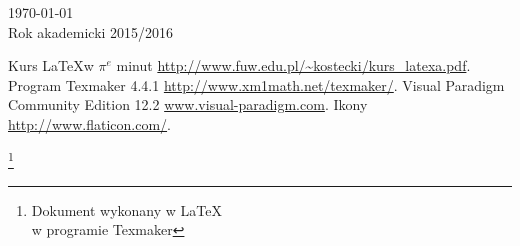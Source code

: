 \documentclass[12pt,a4paper]{article}
\newcommand\blfootnote[1]{%
  \begingroup
  \renewcommand\thefootnote{}\footnote{#1}%
  \addtocounter{footnote}{-1}%
  \endgroup
}
\begin{document}
\begin{titlepage}
\begin{center}
\bigskip
\vspace{\fill}

\begin{minipage}[b]{\textwidth}
    \centering
    \large   
    {\large \today}\\
    {\large Rok akademicki 2015/2016}

\end{minipage}%


\end{center}
\end{titlepage}

\tableofcontents

\begin{thebibliography}{3}
	 Kurs \LaTeX w $\pi^e$ minut \url{http://www.fuw.edu.pl/~kostecki/kurs_latexa.pdf}.
	 Program Texmaker 4.4.1 \url{http://www.xm1math.net/texmaker/}.
	 Visual Paradigm Community Edition 12.2 \url{www.visual-paradigm.com}.
	 Ikony \url{http://www.flaticon.com/}.

\end{thebibliography}
	\blfootnote{Dokument wykonany w \LaTeX \cite{latex} \\ w programie Texmaker\cite{program}}
\end{document}
